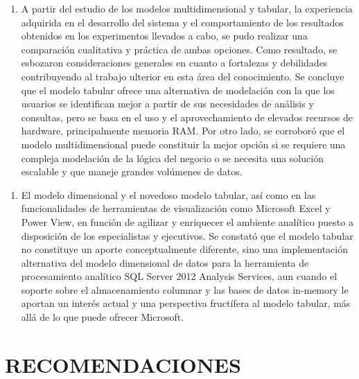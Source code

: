 \documentclass{article} %
\begin{document}
\begin{enumerate}
\item  A partir del estudio de los modelos multidimensional y tabular, la experiencia adquirida en el desarrollo del sistema y el comportamiento de los resultados obtenidos en los experimentos llevados a cabo, se pudo realizar una comparaci\'{o}n cualitativa y pr\'{a}ctica de ambas opciones. Como resultado, se esbozaron consideraciones generales en cuanto a fortalezas y debilidades contribuyendo al trabajo ulterior en esta \'{a}rea del conocimiento. Se concluye que el modelo tabular ofrece una alternativa de modelaci\'{o}n con la que los usuarios se identifican mejor a partir de sus necesidades de an\'{a}lisis y consultas, pero se basa en el uso y el aprovechamiento de elevados recursos de hardware, principalmente memoria RAM. Por otro lado, se corrobor\'{o} que el modelo multidimensional puede constituir la mejor opci\'{o}n si se requiere una compleja modelaci\'{o}n de la l\'{o}gica del negocio o se necesita una soluci\'{o}n escalable y que maneje grandes vol\'{u}menes de datos.
\end{enumerate}
\noindent 
\begin{enumerate}
\item  El modelo dimensional y el novedoso modelo tabular, as\'{i} como en las funcionalidades de herramientas de visualizaci\'{o}n como Microsoft Excel y Power View, en funci\'{o}n de agilizar y enriquecer el ambiente anal\'{i}tico puesto a disposici\'{o}n de los especialistas y ejecutivos. Se constat\'{o} que el modelo tabular no constituye un aporte conceptualmente diferente, sino una implementaci\'{o}n alternativa del modelo dimensional de datos para la herramienta de procesamiento anal\'{i}tico SQL Server 2012 Analysis Services, aun cuando el soporte sobre el almacenamiento columnar y las bases de datos in-memory le aportan un inter\'{e}s actual y una perspectiva fruct\'{i}fera al modelo tabular, m\'{a}s all\'{a} de lo que puede ofrecer Microsoft.
\end{enumerate}
\noindent 

\noindent 

\noindent 

\noindent 

\noindent 

\noindent 

\noindent 

\noindent 

\noindent 

\noindent 
\section{RECOMENDACIONES}
\end{document}
